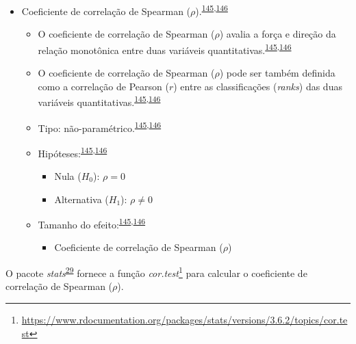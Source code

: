 \documentclass[
  a4paper,
]{book}
\providecommand{\tightlist}{%
  \setlength{\itemsep}{0pt}\setlength{\parskip}{0pt}}
\renewcommand{\href}[2]{#2\footnote{\url{#1}}}
\newenvironment{infobox}[1]
  {
  \begin{itemize}
  \renewcommand{\labelitemi}{
    \raisebox{-.7\height}[0pt][0pt]{
      {\setkeys{Gin}{width=3em,keepaspectratio}
        \texttt{[image: \#1]}}
    }
  }
  \setlength{\fboxsep}{1em}
  \begin{blackbox}
  \item
  }
  {
  \end{blackbox}
  \end{itemize}
  }
\begin{document}
\begin{itemize}
\item
  Coeficiente de correlação de Spearman (\(\rho\)).\textsuperscript{\protect\hyperlink{ref-khamis2008}{145},\protect\hyperlink{ref-allison2022}{146}}

  \begin{itemize}
  \item
    O coeficiente de correlação de Spearman (\(\rho\)) avalia a força e direção da relação monotônica entre duas variáveis quantitativas.\textsuperscript{\protect\hyperlink{ref-khamis2008}{145},\protect\hyperlink{ref-allison2022}{146}}
  \item
    O coeficiente de correlação de Spearman (\(\rho\)) pode ser também definida como a correlação de Pearson (\(r\)) entre as classificações (\emph{ranks}) das duas variáveis quantitativas.\textsuperscript{\protect\hyperlink{ref-khamis2008}{145},\protect\hyperlink{ref-allison2022}{146}}
  \item
    Tipo: não-paramétrico.\textsuperscript{\protect\hyperlink{ref-khamis2008}{145},\protect\hyperlink{ref-allison2022}{146}}
  \item
    Hipóteses:\textsuperscript{\protect\hyperlink{ref-khamis2008}{145},\protect\hyperlink{ref-allison2022}{146}}

    \begin{itemize}
    \item
      Nula (\(H_{0}\)): \(\rho=0\)
    \item
      Alternativa (\(H_{1}\)): \(\rho≠0\)
    \end{itemize}
  \item
    Tamanho do efeito:\textsuperscript{\protect\hyperlink{ref-khamis2008}{145},\protect\hyperlink{ref-allison2022}{146}}

    \begin{itemize}
    \tightlist
    \item
      Coeficiente de correlação de Spearman (\(\rho\))
    \end{itemize}
  \end{itemize}
\end{itemize}

\begin{infobox}{images/Rlogo}
O pacote \emph{stats}\textsuperscript{\protect\hyperlink{ref-stats-2}{29}} fornece a função \href{https://www.rdocumentation.org/packages/stats/versions/3.6.2/topics/cor.test}{\emph{cor.test}} para calcular o coeficiente de correlação de Spearman (\(\rho\)).

\end{infobox}
\end{document}
